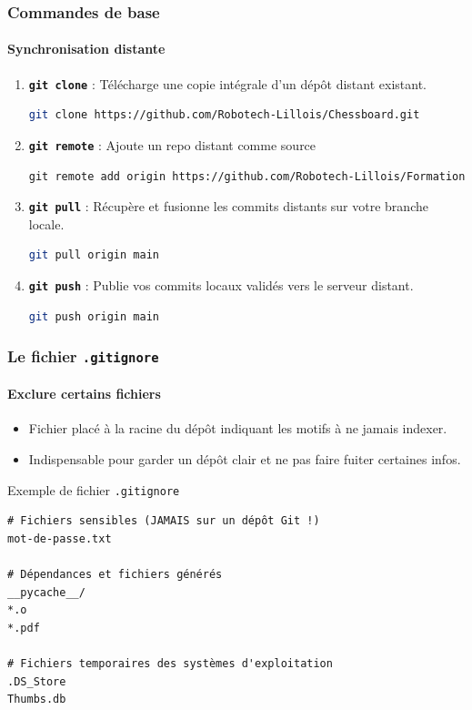\documentclass[
	11pt,
	aspectratio=169
]{beamer}
\begin{document}

\begin{frame}[fragile]
    \frametitle{Commandes de base}
    \framesubtitle{Synchronisation distante}

    \begin{enumerate}
        \item \textbf{\texttt{git clone}} : Télécharge une copie intégrale d'un dépôt distant existant.
\begin{lstlisting}[language=bash]
git clone https://github.com/Robotech-Lillois/Chessboard.git
\end{lstlisting}

        \item \textbf{\texttt{git remote}} : Ajoute un repo distant comme source
\begin{lstlisting}
git remote add origin https://github.com/Robotech-Lillois/Formation
\end{lstlisting}

        \item \textbf{\texttt{git pull}} : Récupère et fusionne les commits distants sur votre branche locale.
\begin{lstlisting}[language=bash]
git pull origin main
\end{lstlisting}

        \item \textbf{\texttt{git push}} : Publie vos commits locaux validés vers le serveur distant.
\begin{lstlisting}[language=bash]
git push origin main
\end{lstlisting}
    \end{enumerate}
\end{frame}

\begin{frame}[fragile]
    \frametitle{Le fichier \texttt{.gitignore}}
    \framesubtitle{Exclure certains fichiers}

    \begin{itemize}
        \item Fichier placé à la racine du dépôt indiquant les motifs à ne jamais indexer.
        \item Indispensable pour garder un dépôt clair et ne pas faire fuiter certaines infos.
    \end{itemize}

    \begin{exampleblock}{Exemple de fichier \texttt{.gitignore}}
\begin{lstlisting}
# Fichiers sensibles (JAMAIS sur un dépôt Git !)
mot-de-passe.txt

# Dépendances et fichiers générés
__pycache__/
*.o
*.pdf

# Fichiers temporaires des systèmes d'exploitation
.DS_Store
Thumbs.db
\end{lstlisting}
    \end{exampleblock}
\end{frame}
\end{document}
